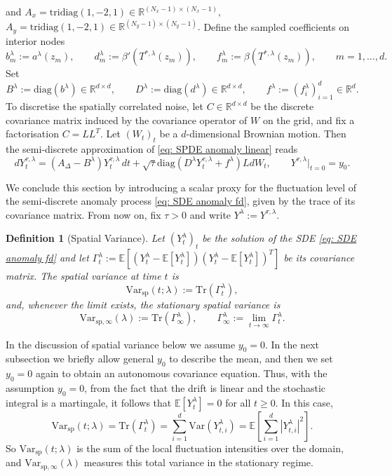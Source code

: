 \documentclass[10pt]{amsart}
\newtheorem{definition}[theorem]{Definition}
\numberwithin{equation}{section}
\begin{document}
and
$
A_x=\mathrm{tridiag}(1,-2,1)\in\mathbb R^{(N_x-1)\times(N_x-1)},$ $
A_y=\mathrm{tridiag}(1,-2,1)\in\mathbb R^{(N_y-1)\times(N_y-1)}.$ Define the sampled coefficients on interior nodes
$$
b_m^\lambda := a^\lambda(z_m),\qquad
d_m^\lambda := \beta'(T^{*,\lambda}(z_m)),\qquad
f_m^\lambda := \beta(T^{*,\lambda}(z_m)),\qquad m=1,\dots,d.
$$
Set
$$
B^\lambda := \mathrm{diag}(b^\lambda)  \in \mathbb{R}^{d\times d}, \qquad D^\lambda := \mathrm{diag}(d^\lambda)\in \mathbb{R}^{d\times d},
\qquad f^\lambda :=     (f_i^\lambda)_{i=1}^d   \in \mathbb{R}^d.
$$
To discretise the spatially correlated noise, let $C\in\mathbb{R}^{d\times d}$ be the discrete covariance
matrix induced by the covariance operator of $W$ on the grid, and fix a factorisation $C=LL^T$.
Let $(W_t)_t$ be a $d$-dimensional Brownian motion. Then the semi-discrete approximation of
\eqref{eq: SPDE anomaly linear} reads
\begin{equation}
dY_t^{\tau,\lambda}= (A_\Delta- B^\lambda) Y_t^{\tau,\lambda} \,dt
+\sqrt{\tau} \mathrm{diag}\left(D^\lambda Y_t^{\tau,\lambda} + f^\lambda\right) L dW_t,
\qquad Y^{\tau,\lambda}|_{t=0}=y_0.
\label{eq: SDE anomaly fd}
\end{equation}

We conclude this section by introducing a scalar proxy for the fluctuation level of the semi-discrete anomaly process \eqref{eq: SDE anomaly fd}, given by the trace of its covariance matrix. From now on, fix $\tau>0$ and write $Y^\lambda := Y^{\tau,\lambda}$.


\begin{definition}[Spatial Variance]
    Let $(Y_t^{\lambda})_t $ be the solution of the SDE \eqref{eq: SDE anomaly fd} and let $\Gamma_t ^{\lambda} := \mathbb{E}[ (Y_t^{\lambda}- \mathbb{E}[Y^{\lambda}_t]) (Y_t^{\lambda} - \mathbb{E}[Y^\lambda_t])^T]$ be its covariance matrix. The \emph{spatial variance} at time $t$ is
    $$
    \mathrm{Var}_{\mathrm{sp}} (t;\lambda ) := \mathrm{Tr} (\Gamma_t^\lambda),
    $$
    and, whenever the limit exists, the \emph{stationary spatial variance} is
    $$
    \mathrm{Var}_{\mathrm{sp},\infty }(\lambda) := \mathrm{Tr} (\Gamma_\infty ^\lambda), \qquad \Gamma_\infty ^\lambda := \lim_{t \to \infty } \Gamma_t^\lambda.
    $$
    \label{def: spatial variance}
\end{definition}
In the discussion of spatial variance below we assume $y_0=0$. In the next subsection we briefly allow general $y_0$ to describe the mean, and then we set $y_0=0$ again to obtain an autonomous covariance equation. Thus, with the assumption $y_0 = 0$, from the fact that the drift is linear and the stochastic integral is a martingale,
it follows that $\mathbb{E}[Y_t^\lambda]=0$ for all $t\geq 0$. In this case,
$$
\mathrm{Var}_{\mathrm{sp}}(t;\lambda)=\mathrm{Tr}(\Gamma_t^\lambda)
=\sum_{i=1}^d \mathrm{Var}(Y_{t,i}^\lambda)
=\mathbb{E}\left[\sum_{i=1}^d |Y_{t,i}^\lambda|^2\right].
$$
So $\mathrm{Var}_{\mathrm{sp}}(t; \lambda)$ is the sum of the local fluctuation intensities over the domain, and
$\mathrm{Var}_{\mathrm{sp},\infty}(\lambda)$ measures this total variance in the stationary regime.
\end{document}
